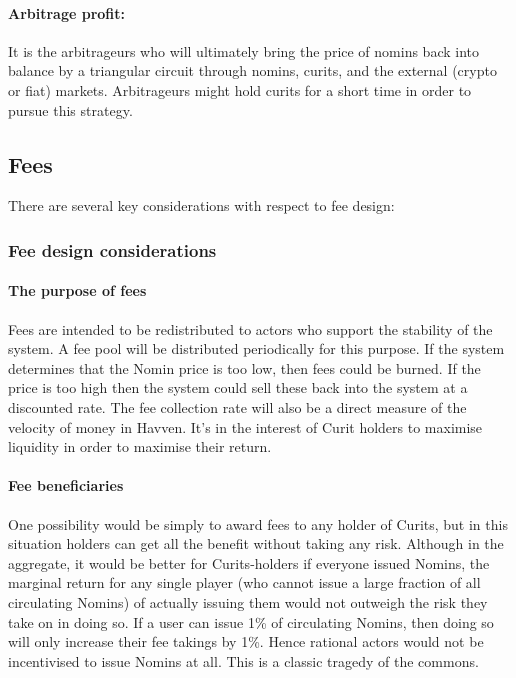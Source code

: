 \paragraph{Arbitrage profit:}
It is the arbitrageurs who will ultimately bring the price of nomins back into balance by a triangular circuit through nomins, curits, and the external (crypto or fiat) markets. Arbitrageurs might hold curits for a short time in order to pursue this strategy.



\pagebreak
\subsection{Fees}

There are several key considerations with respect to fee design:

\subsubsection{Fee design considerations}

\paragraph{The purpose of fees}

Fees are intended to be redistributed to actors who support the stability of the system. A fee pool will be distributed periodically for this purpose.
If the system determines that the Nomin price is too low, then fees could be burned. If the price is too high then the system could sell these back
into the system at a discounted rate. The fee collection rate will also be a direct measure of the velocity of money in Havven. It's in the interest
of Curit holders to maximise liquidity in order to maximise their return.

\paragraph{Fee beneficiaries}

One possibility would be simply to award fees to any holder of Curits,
but in this situation holders can get all the benefit without taking any risk.
Although in the aggregate, it would be better for Curits-holders if everyone issued Nomins,
the marginal return for any single player (who cannot issue a large fraction of all circulating Nomins)
of actually issuing them would not outweigh the risk they take on in doing so. If a user can issue 1\% of circulating
Nomins, then doing so will only increase their fee takings by 1\%. Hence rational actors would not be incentivised to issue Nomins at all.
This is a classic tragedy of the commons.

